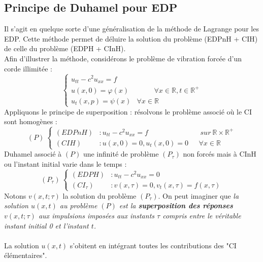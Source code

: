 \documentclass[british,french,11pt, a4paper, openany]{book}
\begin{document}
																
																
			\subsection{Principe de Duhamel pour EDP}
			Il s'agit en quelque sorte d'une généralisation de la méthode de Lagrange pour les EDP. Cette méthode permet de déluire la solution du problème (EDPnH + CIH) de celle du problème (EDPH + CInH).\\
			Afin d'illustrer la méthode, considérons le problème de vibration forcée d'un corde illimitée :
			\begin{equation}
				\left\{\begin{array}{lr}
				u_{tt} - c^2u_{xx} = f\\
				u(x,0) = \varphi(x)&\ \ \ \ \ \ \ \ \ \ \ \forall x\in \mathbb{R}, t\in \mathbb{R}^+\\
				u_t(x,p) = \psi(x) & \forall x \in \mathbb{R}
				\end{array}\right.
			\end{equation}
			Appliquons le principe de superposition : résolvons le problème associé où le CI sont homogènes :
			\begin{equation}
				(P)\ \left\{\begin{array}{llr}
				(EDPnH) &: u_{tt} - c^2u_{xx} = f&\ \ \ \ sur\ \mathbb{R}\times\mathbb{R}^+\\
				(CIH) &: u(x,0) = 0, u_t(x,0) = 0 &\ \ \ \forall x \in \mathbb{R}
				\end{array}\right.
			\end{equation}
			Duhamel associé à $(P)$ une infinité de problème $(P_\tau)$ non forcés mais à CInH ou l'instant initial varie dans le temps :
			\begin{equation}
				(P_\tau)\ \left\{\begin{array}{ll}
				(EDPH) &: u_{tt} - c^2u_{xx} = 0\\
				(CI_\tau) &: v(x,\tau) = 0, v_t(x,\tau) = f(x,\tau)
				\end{array}\right.
			\end{equation}
			Notons $v(x,t;\tau)$ la solution du problème $(P_\tau)$. On peut imaginer que \textit{la solution $u(x,t)$ au problème $(P)$ est la \textbf{superposition des réponses $v(x,t;\tau)$} aux impulsions imposées aux instants $\tau$ compris entre le véritable instant initial 0 et l'instant $t$.}\ \\
																
			\ \\
			La solution $u(x,t)$ s'obitent en intégrant toutes les contributions des "CI élémentaires".
																
\end{document}
